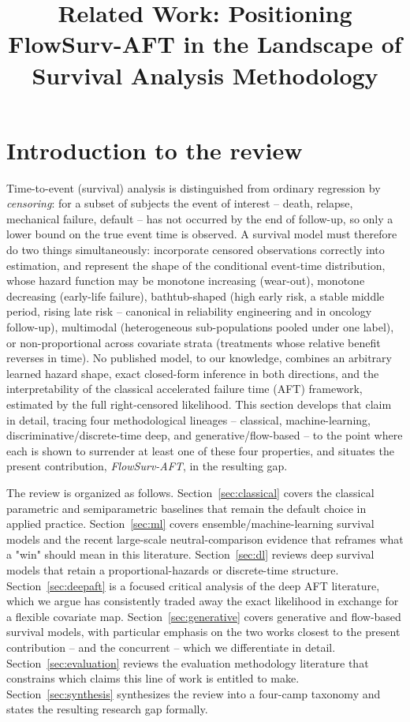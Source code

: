 \documentclass[11pt]{article}
\title{Related Work: Positioning FlowSurv-AFT in the Landscape of\\
Survival Analysis Methodology}
\author{}
\date{}
\begin{document}
\maketitle

\section{Introduction to the review}

Time-to-event (survival) analysis is distinguished from ordinary regression
by \emph{censoring}: for a subset of subjects the event of interest --
death, relapse, mechanical failure, default -- has not occurred by the end
of follow-up, so only a lower bound on the true event time is observed. A
survival model must therefore do two things simultaneously: incorporate
censored observations correctly into estimation, and represent the shape of
the conditional event-time distribution, whose hazard function may be
monotone increasing (wear-out), monotone decreasing (early-life failure),
bathtub-shaped (high early risk, a stable middle period, rising late risk --
canonical in reliability engineering and in oncology follow-up), multimodal
(heterogeneous sub-populations pooled under one label), or non-proportional
across covariate strata (treatments whose relative benefit reverses in
time). No published model, to our knowledge, combines an arbitrary
learned hazard shape, exact closed-form inference in both directions, and
the interpretability of the classical accelerated failure time (AFT)
framework, estimated by the full right-censored likelihood. This section
develops that claim in detail, tracing four methodological lineages --
classical, machine-learning, discriminative/discrete-time deep, and
generative/flow-based -- to the point where each is shown to surrender
at least one of these four properties, and situates the present
contribution, \emph{FlowSurv-AFT}, in the resulting gap.

The review is organized as follows. Section~\ref{sec:classical} covers the
classical parametric and semiparametric baselines that remain the
default choice in applied practice. Section~\ref{sec:ml} covers
ensemble/machine-learning survival models and the recent large-scale
neutral-comparison evidence that reframes what a "win" should mean in
this literature. Section~\ref{sec:dl} reviews deep survival models that
retain a proportional-hazards or discrete-time structure.
Section~\ref{sec:deepaft} is a focused critical analysis of the deep AFT
literature, which we argue has consistently traded away the exact
likelihood in exchange for a flexible covariate map.
Section~\ref{sec:generative} covers generative and flow-based survival
models, with particular emphasis on the two works closest to the present
contribution -- \citet{ausset2021flows} and the concurrent
\citet{licai2026} -- which we differentiate in detail.
Section~\ref{sec:evaluation} reviews the evaluation methodology literature
that constrains which claims this line of work is entitled to make.
Section~\ref{sec:synthesis} synthesizes the review into a four-camp
taxonomy and states the resulting research gap formally.
\end{document}
